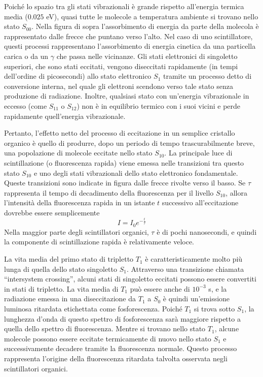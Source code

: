 Poiché lo spazio tra gli stati vibrazionali è grande rispetto all'energia termica media ($0.025$ eV), quasi tutte le molecole a temperatura ambiente si trovano nello stato $S_{00}$. Nella figura di sopra l'assorbimento di energia da parte della molecola è rappresentato dalle frecce che puntano verso l'alto. Nel caso di uno scintillatore, questi processi rappresentano l'assorbimento di energia cinetica da una particella carica o da un $\gamma$ che passa nelle vicinanze. Gli stati elettronici di singoletto superiori, che sono stati eccitati, vengono diseccitati rapidamente (in tempi dell'ordine di picosecondi) allo stato elettronico $S_1$ tramite un processo detto di conversione interna, nel quale gli elettroni scendono verso tale stato senza produzione di radiazione. Inoltre, qualsiasi stato con un'energia vibrazionale in eccesso (come $S_{11}$ o $S_{12}$) non è in equilibrio termico con i suoi vicini e perde rapidamente quell'energia vibrazionale.

Pertanto, l'effetto netto del processo di eccitazione in un semplice cristallo organico è quello di produrre, dopo un periodo di tempo trascurabilmente breve, una popolazione di molecole eccitate nello stato $S_{10}$. La principale luce di scintillazione (o fluorescenza rapida) viene emessa nelle transizioni tra questo stato $S_{10}$ e uno degli stati vibrazionali dello stato elettronico fondamentale. Queste transizioni sono indicate in figura dalle frecce rivolte verso il basso. Se $\tau$ rappresenta il tempo di decadimento della fluorescenza per il livello $S_{10}$, allora l'intensità della fluorescenza rapida in un istante $t$ successivo all'eccitazione dovrebbe essere semplicemente
\begin{equation*}
   I=I_0 e^{-\frac{t}{\tau}}
\end{equation*}
Nella maggior parte degli scintillatori organici, $\tau$ è di pochi nanosecondi, e quindi la componente di scintillazione rapida è relativamente veloce.

La vita media del primo stato di tripletto $T_1$ è caratteristicamente molto più lunga di quella dello stato singoletto $S_1$. Attraverso una transizione chiamata ``intersystem crossing'', alcuni stati di singoletto eccitati possono essere convertiti in stati di tripletto. La vita media di $T_1$ può essere anche di $10^{-3}$ s, e la radiazione emessa in una diseccitazione da $T_1$ a $S_0$ è quindi un'emissione luminosa ritardata etichettata come fosforescenza. Poiché $T_1$ si trova sotto $S_1$, la lunghezza d'onda di questo spettro di fosforescenza sarà maggiore rispetto a quella dello spettro di fluorescenza. Mentre si trovano nello stato $T_1$, alcune molecole possono essere eccitate termicamente di nuovo nello stato $S_1$ e successivamente decadere tramite la fluorescenza normale. Questo processo rappresenta l'origine della fluorescenza ritardata talvolta osservata negli scintillatori organici.

